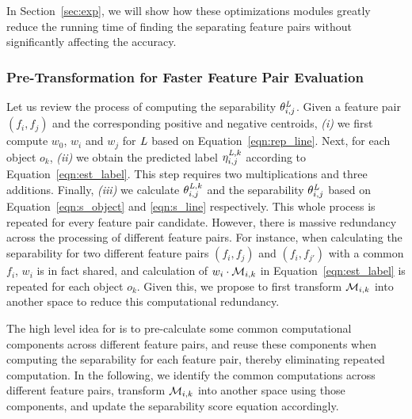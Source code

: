 In Section~\ref{sec:exp}, we will show how these optimizations modules greatly reduce the running time of finding the \topk separating feature pairs without significantly affecting the accuracy.

\subsubsection{Pre-Transformation for Faster Feature Pair Evaluation} \label{ssec:trans}

Let us review the process of computing the separability  $\theta_{i,j}^{\mathit{L}}$. Given a feature pair $(f_i,f_j)$ and the corresponding positive and negative centroids, {\em (i)} we first compute $w_0$, $w_i$ and $w_j$ for $\mathit{L}$ based on Equation~\ref{eqn:rep_line}. Next, for each object $o_k$, {\em (ii)} we obtain the predicted label $\eta_{i,j}^{\mathit{L},k}$ according to Equation~\ref{eqn:est_label}. This step requires two multiplications and three additions. Finally, {\em (iii)} we calculate $\theta_{i,j}^{\mathit{L},k}$ and the separability $\theta_{i,j}^{\mathit{L}}$ based on Equation~\ref{eqn:s_object} and \ref{eqn:s_line} respectively. This whole process is repeated for every feature pair candidate. However,  there is massive redundancy across the processing of different feature pairs. For instance, when calculating the separability for two different feature pairs $(f_i,f_j)$ and $(f_i,f_{j'})$ with a common $f_i$, $w_i$ is in fact shared, and calculation of $w_i\cdot \mm_{i,k}$ in Equation~\ref{eqn:est_label} is repeated for each object $o_k$. Given this, we propose to first transform $\mm_{i,k}$ into another space to reduce this computational redundancy.

 The high level idea for \trans is to pre-calculate some common computational components across different feature pairs, and reuse these components when computing the separability for each feature pair, thereby eliminating repeated computation. In the following, we identify the common computations across different feature pairs, transform $\mm_{i,k}$ into another space using those components, and update the separability score equation accordingly.

